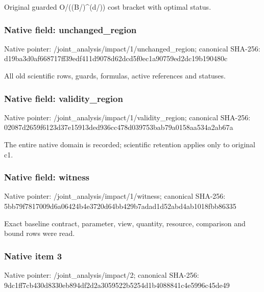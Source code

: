 \documentclass[10pt,a4paper]{article}
\begin{document}
\begingroup\raggedright\sloppy Original guarded O/\allowbreak{}((B/\allowbreak{})\textasciicircum{}(d/\allowbreak{})) cost bracket with optimal status.\par\endgroup

\subsubsection{Native field: unchanged\_\allowbreak{}region}
Native pointer: /joint\_\allowbreak{}analysis/impact/1/unchanged\_\allowbreak{}region; canonical SHA-256: d19ba3d0af668717ff39edf411d9078d62dcd5f0ec1a90759ed2dc19b190480c

\begingroup\raggedright\sloppy All old scientific rows,\allowbreak{} guards,\allowbreak{} formulas,\allowbreak{} active references and statuses.\par\endgroup

\subsubsection{Native field: validity\_\allowbreak{}region}
Native pointer: /joint\_\allowbreak{}analysis/impact/1/validity\_\allowbreak{}region; canonical SHA-256: 02087d2659f6123d37e15913ded936cc478d039753bab79a0158aa534a2ab67a

\begingroup\raggedright\sloppy The entire native domain is recorded;\allowbreak{} scientific retention applies only to original c1.\par\endgroup

\subsubsection{Native field: witness}
Native pointer: /joint\_\allowbreak{}analysis/impact/1/witness; canonical SHA-256: 5bb79f7817009d6a06424b4e3720d64bb429b7adad1d52abd4ab1018fbb86335

\begingroup\raggedright\sloppy Exact baseline contract,\allowbreak{} parameter,\allowbreak{} view,\allowbreak{} quantity,\allowbreak{} resource,\allowbreak{} comparison and bound rows were read.\par\endgroup

\subsubsection{Native item 3}
Native pointer: /joint\_\allowbreak{}analysis/impact/2; canonical SHA-256: 9dc1ff7cb430d8330eb894df2d2a3059522b5254d1b4088841c4e5996c45de49
\end{document}
